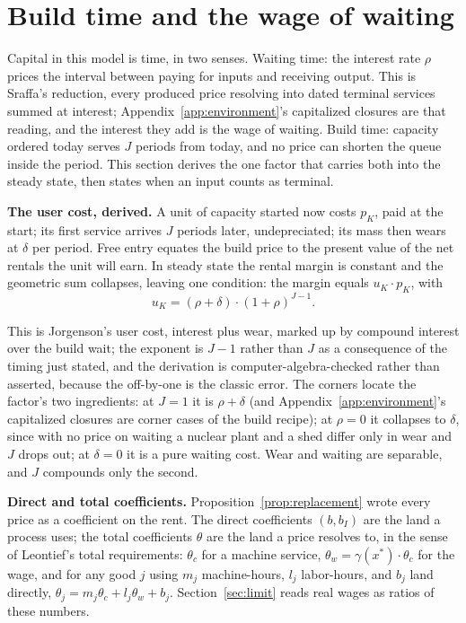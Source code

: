 \documentclass[12pt]{article}
\theoremstyle{plain}
\begin{document}
\section{Build time and the wage of waiting}\label{sec:buildtime}

Capital in this model is time, in two senses. Waiting time: the interest rate $\rho$ prices the interval between paying for inputs and receiving output. This is Sraffa's reduction, every produced price resolving into dated terminal services summed at interest; Appendix~\ref{app:environment}'s capitalized closures are that reading, and the interest they add is the wage of waiting. Build time: capacity ordered today serves $J$ periods from today, and no price can shorten the queue inside the period. This section derives the one factor that carries both into the steady state, then states when an input counts as terminal.

\textbf{The user cost, derived.} A unit of capacity started now costs $p_K$, paid at the start; its first service arrives $J$ periods later, undepreciated; its mass then wears at $\delta$ per period. Free entry equates the build price to the present value of the net rentals the unit will earn. In steady state the rental margin is constant and the geometric sum collapses, leaving one condition: the margin equals $u_K\cdot p_K$, with
\begin{equation}\label{eq:user-cost}
u_K = (\rho + \delta )\cdot (1 + \rho )^{J-1}.
\end{equation}

This is Jorgenson's user cost, interest plus wear, marked up by compound interest over the build wait; the exponent is $J-1$ rather than $J$ as a consequence of the timing just stated, and the derivation is computer-algebra-checked rather than asserted, because the off-by-one is the classic error. The corners locate the factor's two ingredients: at $J = 1$ it is $\rho +\delta$ (and Appendix~\ref{app:environment}'s capitalized closures are corner cases of the build recipe); at $\rho = 0$ it collapses to $\delta$, since with no price on waiting a nuclear plant and a shed differ only in wear and $J$ drops out; at $\delta = 0$ it is a pure waiting cost. Wear and waiting are separable, and $J$ compounds only the second.

\textbf{Direct and total coefficients.} Proposition~\ref{prop:replacement} wrote every price as a coefficient on the rent. The direct coefficients $(b, b_I)$ are the land a process uses; the total coefficients $\theta$ are the land a price resolves to, in the sense of Leontief's total requirements: $\theta _c$ for a machine service, $\theta _w = \gamma (x^*)\cdot \theta _c$ for the wage, and for any good $j$ using $m_j$ machine-hours, $l_j$ labor-hours, and $b_j$ land directly, $\theta _j = m_j\theta _c + l_j\theta _w + b_j$. Section~\ref{sec:limit} reads real wages as ratios of these numbers.
\end{document}
